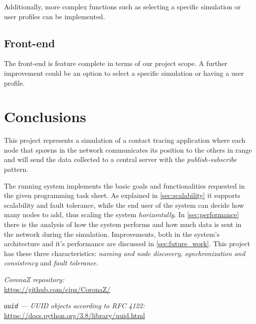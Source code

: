 \documentclass[conference]{IEEEtran}
\begin{document}
		Additionally, more complex functions such as selecting a specific simulation or user profiles can be implemented.
	
	\subsection{Front-end}
	
		The front-end is feature complete in terms of our project scope.
		A further improvement could be an option to select a specific simulation or having a user profile.
	
\section{Conclusions}\label{sec:conclusions}

	This project represents a simulation of a contact tracing application where each node that spawns in the network communicates its position to the others in range and will send the data collected to a central server with the \textit{publish-subscribe} pattern.
	
	The running system implements the basic goals and functionalities requested in the given programming task sheet.
	As explained in \ref{sec:scalability} it supports scalability and fault tolerance, while the end user of the system can decide how many nodes to add, thus scaling the system \textit{horizontally}.
	In \ref{sec:performance} there is the analysis of how the system performs and how much data is sent in the network during the simulation.
	Improvements, both in the system's architecture and it's performance are discussed in \ref{sec:future_work}.
	This project has these three characteristics: \textit{naming and node discovery}, \textit{synchronization and consistency} and \textit{fault tolerance}.

\begin{thebibliography}{00}
	
		\textit{CoronaZ repository:}\\
		\url{https://github.com/cipz/CoronaZ/}
	
		\textit{\texttt{uuid} — UUID objects according to RFC 4122:}\\
		\url{https://docs.python.org/3.8/library/uuid.html}
		
\end{thebibliography}
\end{document}

